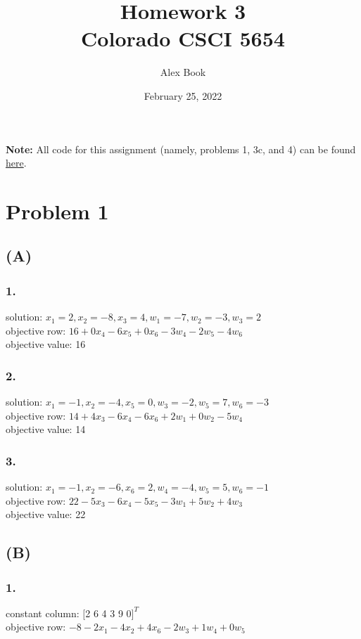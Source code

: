 \documentclass[12pt]{article}
\begin{document}
\title{Homework 3 \\
       Colorado CSCI 5654}
\author{Alex Book}
\date{February 25, 2022}
\maketitle


\textbf{Note:} All code for this assignment (namely, problems 1, 3c, and 4) can be found \href{https://github.com/alexbook00/CSCI-5654/tree/main/Homework/HW3}{here}.

\section*{Problem 1}
\subsection*{(A)}
\subsubsection*{1.}
solution: $x_1=2, x_2=-8, x_3=4, w_1=-7, w_2=-3, w_3=2$ \\
objective row: $16+0x_4-6x_5+0x_6-3w_4-2w_5-4w_6$ \\
objective value: 16

\subsubsection*{2.}
solution: $x_1=-1, x_2=-4, x_5=0, w_3=-2, w_5=7, w_6=-3$ \\
objective row: $14+4x_3-6x_4-6x_6+2w_1+0w_2-5w_4$ \\
objective value: 14

\subsubsection*{3.}
solution: $x_1=-1, x_2=-6, x_6=2, w_4=-4, w_5=5, w_6=-1$ \\
objective row: $22-5x_3-6x_4-5x_5-3w_1+5w_2+4w_3$ \\
objective value: 22

\newpage
\subsection*{(B)}
\subsubsection*{1.}
constant column: $[$2 6 4 3 9 0$]^T$ \\
objective row: $-8-2x_1-4x_2+4x_6-2w_3+1w_4+0w_5$ \\
\end{document}
